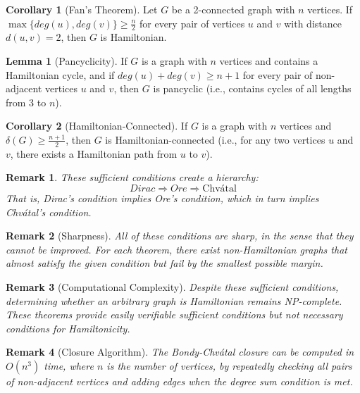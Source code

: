 \documentclass{article}
\newtheorem{remark}{Remark}
\theoremstyle{definition}
\def\deg{deg}%
\newtheorem{lemma}{Lemma}
\newtheorem{corollary}{Corollary}
\begin{document}
\begin{corollary}[Fan's Theorem]
Let $G$ be a 2-connected graph with $n$ vertices. If $\max\{\deg(u), \deg(v)\} \geq \frac{n}{2}$ for every pair of vertices $u$ and $v$ with distance $d(u,v) = 2$, then $G$ is Hamiltonian.
\end{corollary}

\begin{lemma}[Pancyclicity]
If $G$ is a graph with $n$ vertices and contains a Hamiltonian cycle, and if $\deg(u) + \deg(v) \geq n+1$ for every pair of non-adjacent vertices $u$ and $v$, then $G$ is pancyclic (i.e., contains cycles of all lengths from 3 to $n$).
\end{lemma}

\begin{corollary}[Hamiltonian-Connected]
If $G$ is a graph with $n$ vertices and $\delta(G) \geq \frac{n+1}{2}$, then $G$ is Hamiltonian-connected (i.e., for any two vertices $u$ and $v$, there exists a Hamiltonian path from $u$ to $v$).
\end{corollary}

\begin{remark}
These sufficient conditions create a hierarchy:
\[Dirac \Rightarrow Ore \Rightarrow \text{Chv\'{a}tal}\]
That is, Dirac's condition implies Ore's condition, which in turn implies Chvátal's condition.
\end{remark}

\begin{remark}[Sharpness]
All of these conditions are sharp, in the sense that they cannot be improved. For each theorem, there exist non-Hamiltonian graphs that almost satisfy the given condition but fail by the smallest possible margin.
\end{remark}

\begin{remark}[Computational Complexity]
Despite these sufficient conditions, determining whether an arbitrary graph is Hamiltonian remains NP-complete. These theorems provide easily verifiable sufficient conditions but not necessary conditions for Hamiltonicity.
\end{remark}

\begin{remark}[Closure Algorithm]
The Bondy-Chvátal closure can be computed in $O(n^3)$ time, where $n$ is the number of vertices, by repeatedly checking all pairs of non-adjacent vertices and adding edges when the degree sum condition is met.
\end{remark}
\end{document}
